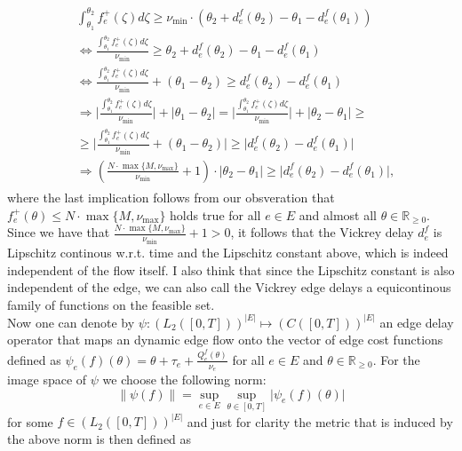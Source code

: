 \documentclass[reqno,openany]{amsbook}
\theoremstyle{definition}
\theoremstyle{plain}
\begin{document}
\begin{align}
	\begin{split}
		&\int_{\theta_1}^{\theta_2} f_e^+(\zeta) d\zeta \geq \nu_{\min} \cdot (\theta_2 + d_e^f(\theta_2) - \theta_1 
		- d_e^f(\theta_1))\\
		&\Leftrightarrow \frac{\int_{\theta_1}^{\theta_2} f_e^+(\zeta) d\zeta}{\nu_{\min}} \geq \theta_2 + d_e^f(\theta_2) - 				\theta_1 - d_e^f(\theta_1)\\
		&\Leftrightarrow \frac{\int_{\theta_1}^{\theta_2} f_e^+(\zeta) d\zeta}{\nu_{\min}} + (\theta_1 - \theta_2) \geq 
		d_e^f(\theta_2) - d_e^f(\theta_1)\\
		&\Rightarrow \lvert \frac{\int_{\theta_1}^{\theta_2} f_e^+(\zeta) d\zeta}{\nu_{\min}} \rvert + \lvert \theta_1 - \theta_2 
		\rvert = \lvert \frac{\int_{\theta_1}^{\theta_2} f_e^+(\zeta) d\zeta}{\nu_{\min}} \rvert + \lvert \theta_2 - \theta_1 
		\rvert \geq \\
		&\geq \lvert \frac{\int_{\theta_1}^{\theta_2} f_e^+(\zeta) d\zeta}{\nu_{\min}} + (\theta_1 - \theta_2) \rvert \geq
		\lvert d_e^f(\theta_2) - d_e^f(\theta_1) \rvert \\
		&\Rightarrow (\frac{N \cdot \max\{M, \nu_{\max}\}}{\nu_{\min}} + 1) \cdot \lvert \theta_2 - \theta_1 \rvert \geq 
		\lvert d_e^f(\theta_2) - d_e^f(\theta_1) \rvert,
	\end{split}
\end{align}
where the last implication follows from our obsveration that $f_e^+(\theta) \leq N \cdot \max\{M, \nu_{\max}\}$ holds true for all $e \in E$ and almost all $\theta \in \mathbb{R}_{\geq 0}$. Since we have that $\frac{N \cdot \max\{M, \nu_{\max}\}}{\nu_{\min}} + 1 > 0$, it follows that the Vickrey delay $d_e^f$ is Lipschitz continous w.r.t. time and the Lipschitz constant above, which is indeed independent of the flow itself. I also think that since the Lipschitz constant is also independent of the edge, we can also call the Vickrey edge delays a equicontinous family of functions on the feasible set.\\
Now one can denote by $\psi: (L_2([0,T]))^{\lvert E \rvert} \mapsto (C([0,T]))^{\lvert E \rvert}$ an edge delay operator that maps an dynamic edge flow onto the vector of edge cost functions defined as $\psi_e(f)(\theta) = \theta + \tau_e + \frac{Q_e^f(\theta)}{\nu_e}$ for all $e \in E$ and $\theta \in \mathbb{R}_{\geq 0}$. For the image space of $\psi$ we choose the following norm:
\[ \lVert \psi(f) \rVert = \sup_{e \in E} \sup_{\theta \in [0,T]} \lvert \psi_e(f)(\theta) \rvert \]
for some $f \in (L_2([0,T]))^{\lvert E \rvert}$ and just for clarity the metric that is induced by the above norm is then defined as
\end{document}
